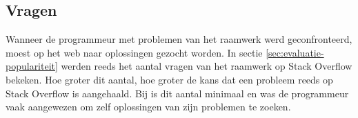 \subsection{Vragen}
Wanneer de programmeur met problemen van het raamwerk werd geconfronteerd, moest op het web naar oplossingen gezocht worden.
In sectie \ref{sec:evaluatie-populariteit} werden reeds het aantal vragen van het raamwerk op Stack Overflow bekeken.
Hoe groter dit aantal,  hoe groter de kans dat een probleem reeds op Stack Overflow is aangehaald.
Bij \lungo{} is dit aantal minimaal en was de programmeur vaak aangewezen om zelf oplossingen van zijn problemen te zoeken.














